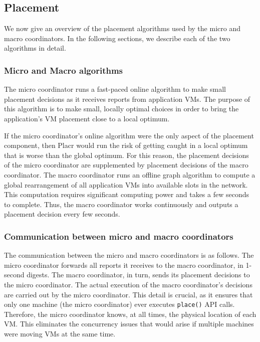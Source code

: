 \documentclass[11pt]{article}
\begin{document}
\subsection{Placement}

We now give an overview of the placement algorithms used by the micro and macro coordinators.  In the following sections, we describe each of the two algorithms in detail.

\subsubsection{Micro and Macro algorithms}

The micro coordinator runs a fast-paced online algorithm to make small placement decisions as it receives reports from application VMs.  The purpose of this algorithm is to make small, locally optimal choices in order to bring the application's VM placement close to a local optimum.

If the micro coordinator's online algorithm were the only aspect of the placement component, then Placr would run the risk of getting caught in a local optimum that is worse than the global optimum.  For this reason, the placement decisions of the micro coordinator are supplemented by placement decisions of the macro coordinator.  The macro coordinator runs an offline graph algorithm to compute a global rearrangement of all application VMs into available slots in the network.  This computation requires significant computing power and takes a few seconds to complete.  Thus, the macro coordinator works continuously and outputs a placement decision every few seconds.

\subsubsection{Communication between micro and macro coordinators}

The communication between the micro and macro coordinators is as follows.  The micro coordinator forwards all reports it receives to the macro coordinator, in 1-second digests.  The macro coordinator, in turn, sends its placement decisions to the micro coordinator.  The actual execution of the macro coordinator's decisions are carried out by the micro coordinator.  This detail is crucial, as it ensures that only one machine (the micro coordinator) ever executes {\tt place()} API calls.  Therefore, the micro coordinator knows, at all times, the physical location of each VM.  This eliminates the concurrency issues that would arise if multiple machines were moving VMs at the same time.
\end{document}
